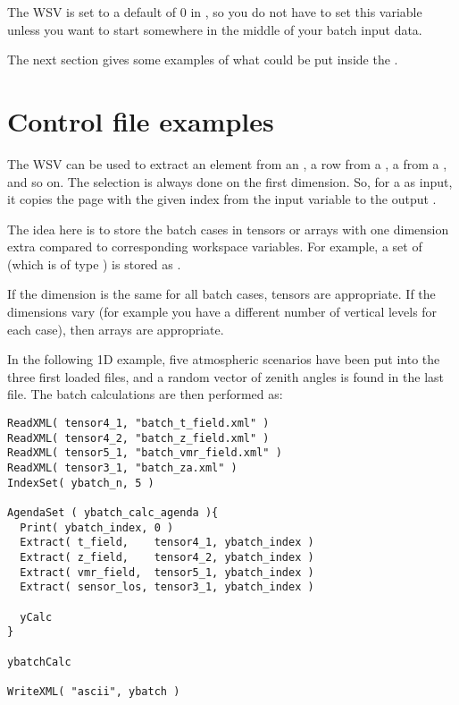 The WSV  is set to a default of 0 in
, so you do not have to set this variable
unless you want to start somewhere in the middle of your batch input
data. 

The next section gives some examples of what could be put inside
the .

\section{Control file examples}
%
The WSV  can be used to extract an element from an
, a row from a , a
 from a , and so on. The
selection is always done on the first dimension. So, for a
 as input, it copies the page with the given index
from the input  variable to the output
.

The idea here is to store the batch cases in tensors or arrays with
one dimension extra compared to corresponding workspace variables. For
example, a set of  (which is of type
) is stored as .

If the dimension is the same for all batch cases, tensors are
appropriate. If the dimensions vary (for example you have a different
number of vertical levels for each case), then arrays are appropriate.

In the following 1D example, five atmospheric scenarios
have been put into the three first loaded files, and a random vector
of zenith angles is found in the last file. The batch calculations
are then performed as:

\begin{lstlisting}
ReadXML( tensor4_1, "batch_t_field.xml" )
ReadXML( tensor4_2, "batch_z_field.xml" )
ReadXML( tensor5_1, "batch_vmr_field.xml" )
ReadXML( tensor3_1, "batch_za.xml" )
IndexSet( ybatch_n, 5 )

AgendaSet ( ybatch_calc_agenda ){
  Print( ybatch_index, 0 )
  Extract( t_field,    tensor4_1, ybatch_index )
  Extract( z_field,    tensor4_2, ybatch_index )
  Extract( vmr_field,  tensor5_1, ybatch_index )
  Extract( sensor_los, tensor3_1, ybatch_index )

  yCalc
}

ybatchCalc

WriteXML( "ascii", ybatch )
\end{lstlisting}

